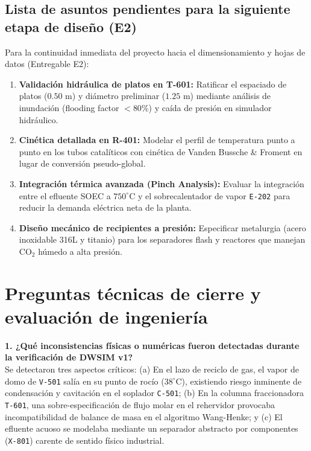 \documentclass[11pt,letterpaper]{article}
\begin{document}
\vspace{0.4cm}
\subsection{Lista de asuntos pendientes para la siguiente etapa de diseño (E2)}

Para la continuidad inmediata del proyecto hacia el dimensionamiento y hojas de datos (Entregable E2):
\begin{enumerate}
    \item \textbf{Validación hidráulica de platos en T-601:} Ratificar el espaciado de platos ($0.50\text{ m}$) y diámetro preliminar ($1.25\text{ m}$) mediante análisis de inundación (flooding factor $<80\%$) y caída de presión en simulador hidráulico.
    \item \textbf{Cinética detallada en R-401:} Modelar el perfil de temperatura punto a punto en los tubos catalíticos con cinética de Vanden Bussche \& Froment en lugar de conversión pseudo-global.
    \item \textbf{Integración térmica avanzada (Pinch Analysis):} Evaluar la integración entre el efluente SOEC a $750^\circ\text{C}$ y el sobrecalentador de vapor \texttt{E-202} para reducir la demanda eléctrica neta de la planta.
    \item \textbf{Diseño mecánico de recipientes a presión:} Especificar metalurgia (acero inoxidable 316L y titanio) para los separadores flash y reactores que manejan $\text{CO}_2$ húmedo a alta presión.
\end{enumerate}

\clearpage

\section{Preguntas técnicas de cierre y evaluación de ingeniería}

\textbf{1. ¿Qué inconsistencias físicas o numéricas fueron detectadas durante la verificación de DWSIM v1?}\\
Se detectaron tres aspectos críticos: (a) En el lazo de reciclo de gas, el vapor de domo de \texttt{V-501} salía en su punto de rocío ($38^\circ\text{C}$), existiendo riesgo inminente de condensación y cavitación en el soplador \texttt{C-501}; (b) En la columna fraccionadora \texttt{T-601}, una sobre-especificación de flujo molar en el rehervidor provocaba incompatibilidad de balance de masa en el algoritmo Wang-Henke; y (c) El efluente acuoso se modelaba mediante un separador abstracto por componentes (\texttt{X-801}) carente de sentido físico industrial.
\end{document}
